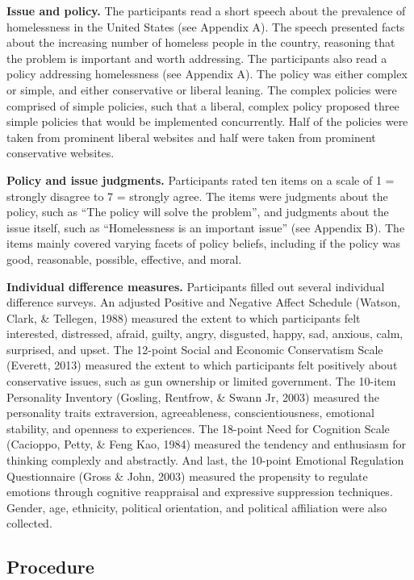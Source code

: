 \documentclass[man,draftall]{apa6}
\begin{document}
\textbf{Issue and policy.} The participants read a short speech about
the prevalence of homelessness in the United States (see Appendix A).
The speech presented facts about the increasing number of homeless
people in the country, reasoning that the problem is important and worth
addressing. The participants also read a policy addressing homelessness
(see Appendix A). The policy was either complex or simple, and either
conservative or liberal leaning. The complex policies were comprised of
simple policies, such that a liberal, complex policy proposed three
simple policies that would be implemented concurrently. Half of the
policies were taken from prominent liberal websites and half were taken
from prominent conservative websites.

\textbf{Policy and issue judgments.} Participants rated ten items on a
scale of 1 = strongly disagree to 7 = strongly agree. The items were
judgments about the policy, such as \enquote{The policy will solve the
problem}, and judgments about the issue itself, such as
\enquote{Homelessness is an important issue} (see Appendix B). The items
mainly covered varying facets of policy beliefs, including if the policy
was good, reasonable, possible, effective, and moral.

\textbf{Individual difference measures.} Participants filled out several
individual difference surveys. An adjusted Positive and Negative Affect
Schedule (Watson, Clark, \& Tellegen, 1988) measured the extent to which
participants felt interested, distressed, afraid, guilty, angry,
disgusted, happy, sad, anxious, calm, surprised, and upset. The 12-point
Social and Economic Conservatism Scale (Everett, 2013) measured the
extent to which participants felt positively about conservative issues,
such as gun ownership or limited government. The 10-item Personality
Inventory (Gosling, Rentfrow, \& Swann Jr, 2003) measured the
personality traits extraversion, agreeableness, conscientiousness,
emotional stability, and openness to experiences. The 18-point Need for
Cognition Scale (Cacioppo, Petty, \& Feng Kao, 1984) measured the
tendency and enthusiasm for thinking complexly and abstractly. And last,
the 10-point Emotional Regulation Questionnaire (Gross \& John, 2003)
measured the propensity to regulate emotions through cognitive
reappraisal and expressive suppression techniques. Gender, age,
ethnicity, political orientation, and political affiliation were also
collected.

\subsection{Procedure}\label{procedure}
\end{document}
